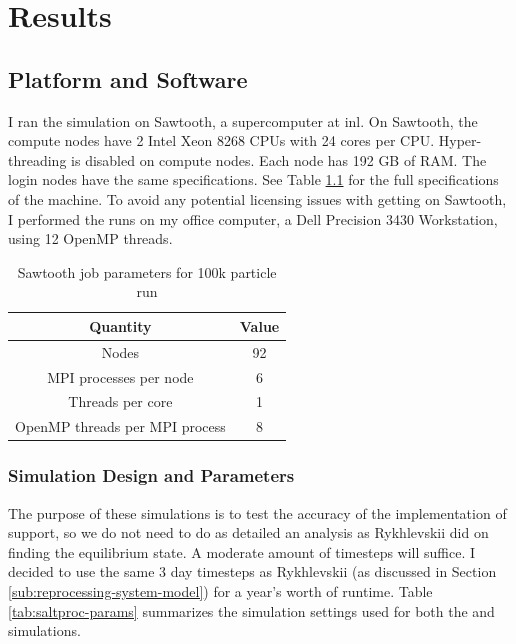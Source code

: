 \chapter{Results}
\label{ch:chapter5}
\glsresetall

\section{Platform and Software}
\label{sub:platform-software}
I ran the \OpenMC simulation on Sawtooth, a supercomputer at
\Gls{inl}. On Sawtooth, the compute nodes have 2 Intel Xeon 8268 CPUs with 24 cores per
CPU. Hyper-threading is disabled on compute nodes. Each node has 192 GB of RAM.
The login nodes have the same specifications. See Table \ref{tab:sawtooth-params}
for the full specifications of the machine. To avoid any potential licensing
issues with getting \SerpentTWO on Sawtooth, I performed the \SerpentTWO runs
on my office computer, a Dell Precision 3430 Workstation, using 12 OpenMP threads.

\begin{table}[htpb] 
    \centering 
    \caption{Sawtooth job parameters for 100k particle \OpenMC run}
    \label{tab:sawtooth-params}
    \begin{tabular}{|c|c|} 
        \hline
        Quantity & Value\\
        \hline
        Nodes & 92 \\
        \hline
        MPI processes per node & 6 \\
        \hline
        Threads per core & 1 \\
        \hline
        OpenMP threads per MPI process & 8 \\
        \hline
    \end{tabular}
\end{table}

\subsection{Simulation Design and Parameters}
\label{sub:simulation-parameters}

The purpose of these simulations is to test the accuracy of
the implementation of \OpenMC support, so we do not need to do as detailed an
analysis as Rykhlevskii did on finding the equilibrium state. A moderate amount
of timesteps will suffice. I decided to use the same 3 day timesteps as Rykhlevskii
\cite{rykhlevskii_modeling_2019} (as discussed in Section \ref{sub:reprocessing-system-model})
for a year's worth of runtime. Table \ref{tab:saltproc-params} summarizes the simulation
settings used for both the \SerpentTWO and \OpenMC simulations. 
 
